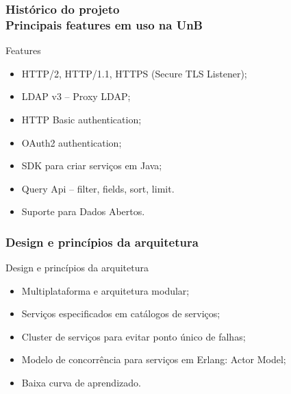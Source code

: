 \documentclass{beamer}
\begin{document}
\begin{frame}
	\frametitle{Histórico do projeto \\ \small{Principais features em uso na UnB}}

\begin{exampleblock}{Features}
	
	\begin{itemize}
		\item<1->HTTP/2, HTTP/1.1, HTTPS (Secure TLS Listener);
		\item<1->LDAP v3 -- Proxy LDAP;
		\item<1->HTTP Basic authentication;
		\item<1->OAuth2 authentication;
		\item<1->SDK para criar serviços em Java;
		\item<1->Query Api -- filter, fields, sort, limit.
		\item<1->Suporte para Dados Abertos.
	\end{itemize}
	
\end{exampleblock}


\end{frame}




\begin{frame}
\frametitle{Design e princípios da arquitetura}

\begin{exampleblock}{Design e princípios da arquitetura}
	
	\begin{itemize}
		\item<1->Multiplataforma e arquitetura modular;
		\item<1->Serviços especificados em catálogos de serviços;
		\item<1->Cluster de serviços para evitar ponto único de falhas;
		\item<1->Modelo de concorrência para serviços em Erlang: Actor Model;
		\item<1->Baixa curva de aprendizado.
	\end{itemize}
	
\end{exampleblock}


\end{frame}
\end{document}
